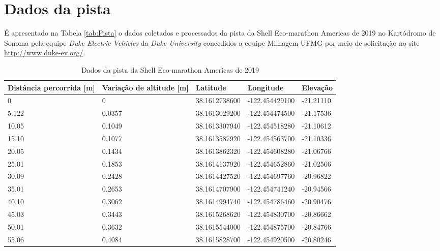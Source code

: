 \chapter{Dados da pista}

É apresentado na Tabela \ref{tab:Pista} o dados coletados e processados da pista da Shell Eco-marathon Americas de 2019
 no Kartódromo de Sonoma pela equipe \textit{Duke Electric Vehicles} da 
\textit{Duke University} concedidos a equipe Milhagem UFMG por meio de solicitação no site \url{http://www.duke-ev.org/}.

\begin{longtable}{p{2.5cm}p{2.5cm}p{3cm}p{3cm}p{2.5cm}}
    \caption{Dados da pista da Shell Eco-marathon Americas de 2019}\\
    \toprule
	\textbf{Distância percorrida [m]} & \textbf{Variação de altitude [m]} & \textbf{Latitude} & \textbf{Longitude} &\textbf{Elevação}\\
    \hline
        0	  &       0	    &               38.1612738600  &   -122.454429100   &	-21.21110 \\
        5.122  &	     0.0357 &               38.1613029200  &   -122.454474500   &	-21.17536 \\
        10.05  &	     0.1049 &               38.1613307940  &   -122.454518280   &	-21.10612 \\
        15.10  &	     0.1077 &               38.1613587920  &   -122.454563700   &	-21.10336 \\
        20.05  &	     0.1434 &               38.1613862320  &   -122.454608280   &	-21.06766 \\
        25.01  &	     0.1853 &               38.1614137920  &   -122.454652860   &	-21.02566 \\
        30.09  &	     0.2428 &               38.1614427520  &   -122.454697760   &	-20.96822 \\
        35.01  &	     0.2653 &               38.1614707900  &   -122.454741240   &	-20.94566 \\
        40.10  &	     0.3062 &               38.1614994740  &   -122.454786460   &	-20.90476 \\
        45.03  &	     0.3443 &               38.1615268620  &   -122.454830700   &	-20.86662 \\
        50.01  &	     0.3632 &               38.1615544000  &   -122.454875700   &	-20.84766 \\
        55.06  &	     0.4084 &               38.1615828700  &   -122.454920500   &	-20.80246 \\

\end{longtable}
